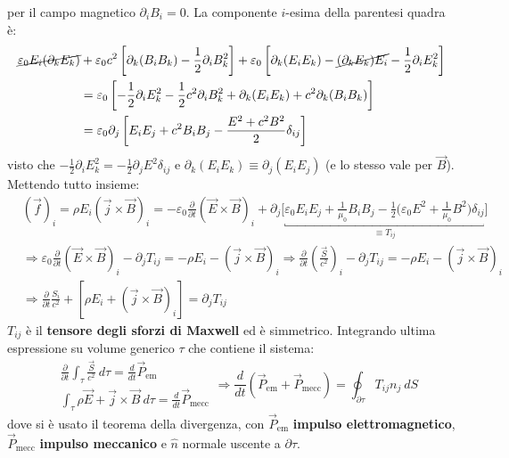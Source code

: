 \documentclass[a4paper]{scrartcl}
\numberwithin{equation}{subsection}
\theoremstyle{style1}
\begin{document}
per il campo magnetico $\partial _i B_i = 0$. La componente $i$-esima della parentesi quadra \`e:
\[
	\begin{split}
		\cancel{\varepsilon _0 E_i (\partial _k E_k)} &+ \varepsilon _0 c^2 \left[ \partial _k (B_i B_k) - \frac{1}{2}\partial _i B_k^2 \right] + \varepsilon _0 \left[ \partial _k (E_i E_k) - \cancel{(\partial _k E_k) E_i} -\frac{1}{2}\partial _i E_k^2\right] \\
							      &= \varepsilon _0 \left[ -\frac{1}{2}\partial _i E_k^2 - \frac{1}{2}c^2 \partial _i B_k^2 + \partial _k (E_iE_k) + c^2 \partial _k (B_i B_k) \right] \\
							      &=\varepsilon _0 \partial _j \left[ E_i E_j+c^2 B_i B_j - \frac{E^2 + c^2 B^2}{2}\delta _{ij}  \right] 
	\end{split}
\] 
visto che $-\frac{1}{2}\partial _i E_k^2 = - \frac{1}{2}\partial _j E^2 \delta _{ij} $ e $\partial _k (E_i E_k) \equiv \partial _j (E_i E_j)$ (e lo stesso vale per $\vec{B}$). Mettendo tutto insieme:
\begin{equation}
	\begin{split}
		&(\vec{f})_i = \rho E_i  (\vec{j}\times \vec{B})_i = -\varepsilon _0 \frac{\partial }{\partial t} (\vec{E}\times \vec{B})_i + \partial _j \bigg[ \underbracket{\varepsilon _0 E_i E_j + \frac{1}{\mu_0} B_i B_j -\frac{1}{2} \Big(\varepsilon _0E^2 + \frac{1}{\mu_0} B^2 \Big) \delta _{ij} }_{\equiv  T_{ij} }   \bigg] \\
		&\Rightarrow \varepsilon _0 \frac{\partial }{\partial t} (\vec{E}\times \vec{B})_i - \partial _j T_{ij}  = - \rho E_i - (\vec{j}\times \vec{B})_i \Rightarrow \frac{\partial }{\partial t} \left(\frac{\vec{S}}{c^2}\right) _i - \partial _j T_{ij} =-\rho E_i - (\vec{j}\times \vec{B})_i\\
		&\Rightarrow \frac{\partial }{\partial t} \frac{S_i}{c^2} + \left[ \rho  E_i + (\vec{j}\times \vec{B})_i \right]  = \partial _j T_{ij} 
	\end{split}
\end{equation}
$T_{ij} $ \`e il \textbf{tensore degli sforzi di Maxwell} ed \`e simmetrico. Integrando ultima espressione su volume generico $\tau $ che contiene il sistema:
\begin{equation}
	\begin{split}
		&\frac{\partial }{\partial t} \int_{\tau } \frac{\vec{S}}{c^2} \ d\tau = \frac{d }{d t} \vec{P}_\text{em}\\
		&\int_{\tau } \rho \vec{E}+ \vec{j}\times \vec{B}\ d\tau = \frac{d }{d t}  \vec{P}_\text{mecc}
	\end{split} \Rightarrow \frac{d }{d t} (\vec{P}_\text{em}+\vec{P}_\text{mecc}) = \oint_{\partial \tau } T_{ij} n_j \ dS
\end{equation}
dove si \`e usato il teorema della divergenza, con $\vec{P}_\text{em}$ \textbf{impulso elettromagnetico}, $\vec{P}_\text{mecc}$ \textbf{impulso meccanico} e $\hat{n}$ normale uscente a $\partial \tau $.
\end{document}
